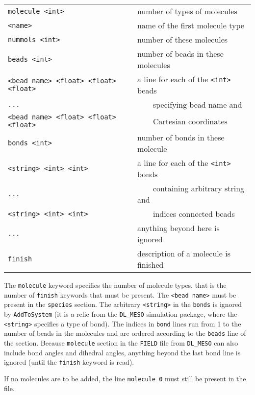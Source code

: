 \noindent
\begin{longtable}{ll}
  \texttt{molecule <int>} & number of types of molecules \\
  \texttt{<name>} & name of the first molecule type \\
  \texttt{nummols <int>} & number of these molecules \\
  \texttt{beads <int>} & number of beads in these molecules \\
  \texttt{<bead name> <float> <float> <float>} & a line for each of the \texttt{<int>} beads \\
  \texttt{...} & \ \ \ \ specifying bead name and \\
  \texttt{<bead name> <float> <float> <float>} & \ \ \ \ Cartesian coordinates \\
  \texttt{bonds <int>} & number of bonds in these molecule \\
  \texttt{<string> <int> <int>} & a line for each of the \texttt{<int>} bonds \\
  \texttt{...} & \ \ \ \ containing arbitrary string and \\
  \texttt{<string> <int> <int>} & \ \ \ \ indices connected beads \\
  \texttt{...} & anything beyond here is ignored \\
  \texttt{finish} & description of a molecule is finished \\
\end{longtable}

The \texttt{molecule} keyword specifies the number of molecule types, that
is the number of \texttt{finish} keywords that must be present. The
\texttt{<bead name>} must be present in the \texttt{species} section. The
arbitrary \texttt{<string>} in the \texttt{bonds} is ignored by
\texttt{AddToSystem} (it is a relic from the \texttt{DL\_MESO} simulation
package, where the \texttt{<string>} specifies a type of bond). The indices
in \texttt{bond} lines run from 1 to the number of beads in the molecules and are
ordered according to the \texttt{beads} line of the section. Because
\texttt{molecule} section in the \texttt{FIELD} file from \texttt{DL\_MESO}
can also include bond angles and dihedral angles, anything beyond the last
bond line is ignored (until the \texttt{finish} keyword is read).

If no molecules are to be added, the line \texttt{molecule 0} must still be
present in the file.

